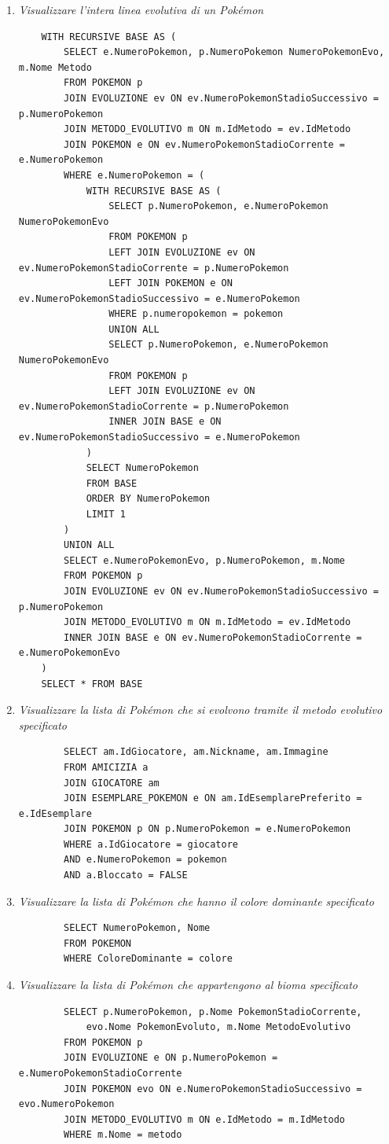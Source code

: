 \documentclass[a4paper,12pt]{report}
\begin{document}
\begin{enumerate}
	\item \textit{Visualizzare l'intera linea evolutiva di un Pokémon}
	\begin{verbatim}
	WITH RECURSIVE BASE AS (
		SELECT e.NumeroPokemon, p.NumeroPokemon NumeroPokemonEvo, m.Nome Metodo
		FROM POKEMON p
		JOIN EVOLUZIONE ev ON ev.NumeroPokemonStadioSuccessivo = p.NumeroPokemon
		JOIN METODO_EVOLUTIVO m ON m.IdMetodo = ev.IdMetodo
		JOIN POKEMON e ON ev.NumeroPokemonStadioCorrente = e.NumeroPokemon
		WHERE e.NumeroPokemon = (
			WITH RECURSIVE BASE AS (
				SELECT p.NumeroPokemon, e.NumeroPokemon NumeroPokemonEvo
				FROM POKEMON p
				LEFT JOIN EVOLUZIONE ev ON ev.NumeroPokemonStadioCorrente = p.NumeroPokemon
				LEFT JOIN POKEMON e ON ev.NumeroPokemonStadioSuccessivo = e.NumeroPokemon
				WHERE p.numeropokemon = pokemon
				UNION ALL
				SELECT p.NumeroPokemon, e.NumeroPokemon NumeroPokemonEvo
				FROM POKEMON p
				LEFT JOIN EVOLUZIONE ev ON ev.NumeroPokemonStadioCorrente = p.NumeroPokemon
				INNER JOIN BASE e ON ev.NumeroPokemonStadioSuccessivo = e.NumeroPokemon
			)
			SELECT NumeroPokemon
			FROM BASE
			ORDER BY NumeroPokemon
			LIMIT 1
		)
		UNION ALL
		SELECT e.NumeroPokemonEvo, p.NumeroPokemon, m.Nome
		FROM POKEMON p
		JOIN EVOLUZIONE ev ON ev.NumeroPokemonStadioSuccessivo = p.NumeroPokemon
		JOIN METODO_EVOLUTIVO m ON m.IdMetodo = ev.IdMetodo
		INNER JOIN BASE e ON ev.NumeroPokemonStadioCorrente = e.NumeroPokemonEvo
	)
	SELECT * FROM BASE
	\end{verbatim}
	
	\item \textit{Visualizzare la lista di Pokémon che si evolvono tramite il metodo evolutivo specificato}
	\begin{verbatim}
		SELECT am.IdGiocatore, am.Nickname, am.Immagine
		FROM AMICIZIA a
		JOIN GIOCATORE am
		JOIN ESEMPLARE_POKEMON e ON am.IdEsemplarePreferito = e.IdEsemplare
		JOIN POKEMON p ON p.NumeroPokemon = e.NumeroPokemon
		WHERE a.IdGiocatore = giocatore
		AND e.NumeroPokemon = pokemon
		AND a.Bloccato = FALSE
	\end{verbatim}
	
	\item \textit{Visualizzare la lista di Pokémon che hanno il colore dominante specificato}
	\begin{verbatim}
		SELECT NumeroPokemon, Nome
		FROM POKEMON
		WHERE ColoreDominante = colore
	\end{verbatim}
	
	\item \textit{Visualizzare la lista di Pokémon che appartengono al bioma specificato}
	\begin{verbatim}
		SELECT p.NumeroPokemon, p.Nome PokemonStadioCorrente,
			evo.Nome PokemonEvoluto, m.Nome MetodoEvolutivo
		FROM POKEMON p
		JOIN EVOLUZIONE e ON p.NumeroPokemon = e.NumeroPokemonStadioCorrente
		JOIN POKEMON evo ON e.NumeroPokemonStadioSuccessivo = evo.NumeroPokemon
		JOIN METODO_EVOLUTIVO m ON e.IdMetodo = m.IdMetodo
		WHERE m.Nome = metodo
	\end{verbatim}
	

\end{enumerate}
\end{document}
